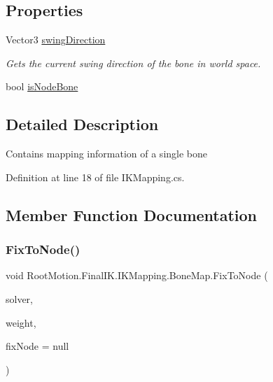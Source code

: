 \subsection*{Properties}
\begin{DoxyCompactItemize}
\item 
Vector3 \mbox{\hyperlink{class_root_motion_1_1_final_i_k_1_1_i_k_mapping_1_1_bone_map_ac0034c56a6f73934144943493a775955}{swing\+Direction}}
\begin{DoxyCompactList}\small\item\em Gets the current swing direction of the bone in world space. \end{DoxyCompactList}\item 
bool \mbox{\hyperlink{class_root_motion_1_1_final_i_k_1_1_i_k_mapping_1_1_bone_map_ada6d7dbe3614e41d32fde0bb86c255c7}{is\+Node\+Bone}}
\end{DoxyCompactItemize}


\subsection{Detailed Description}
Contains mapping information of a single bone 



Definition at line 18 of file I\+K\+Mapping.\+cs.



\subsection{Member Function Documentation}
\mbox{\label{class_root_motion_1_1_final_i_k_1_1_i_k_mapping_1_1_bone_map_a2b6a806ce90035aa4fd1499a6a4a3ba1}} 
\subsubsection{\texorpdfstring{Fix\+To\+Node()}{FixToNode()}}
{\footnotesize\ttfamily void Root\+Motion.\+Final\+I\+K.\+I\+K\+Mapping.\+Bone\+Map.\+Fix\+To\+Node (\begin{DoxyParamCaption}\item[{\mbox{\hyperlink{class_root_motion_1_1_final_i_k_1_1_i_k_solver_full_body}{I\+K\+Solver\+Full\+Body}}}]{solver,  }\item[{float}]{weight,  }\item[{\mbox{\hyperlink{class_root_motion_1_1_final_i_k_1_1_i_k_solver_1_1_node}{I\+K\+Solver.\+Node}}}]{fix\+Node = {\ttfamily null} }\end{DoxyParamCaption})}



